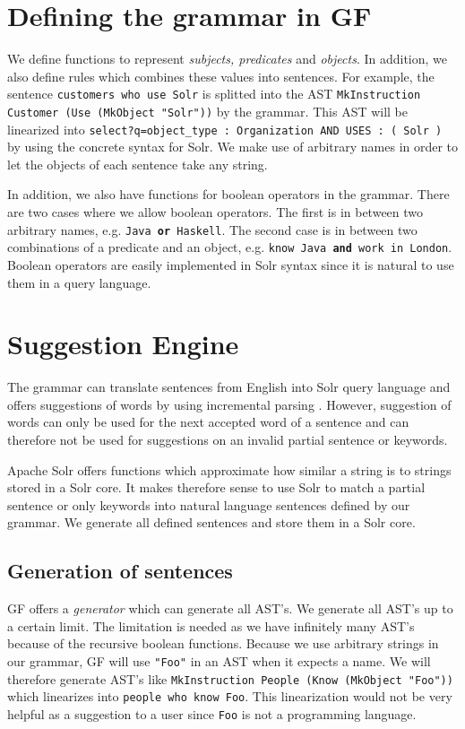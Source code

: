 \documentclass[10pt, a4paper]{article}
\begin{document}
\section{Defining the grammar in GF}
We define functions to represent \emph{subjects, predicates} and \emph{objects}. In addition, we also define rules which combines these values into sentences. For example, the sentence \texttt{customers who use Solr} is splitted into the AST \texttt{MkInstruction Customer (Use (MkObject "Solr"))} by the grammar. This AST will be linearized into \texttt{select?q=object\_type : Organization AND USES : ( Solr )} by using the concrete syntax for Solr. We make use of arbitrary names in order to let the objects of each sentence take any string.

In addition, we also have functions for boolean operators in the grammar. There are two cases where we allow boolean operators. The first is in between two arbitrary names, e.g. \texttt{Java \textbf{or} Haskell}. The second case is in between two combinations of a predicate and an object, e.g. \texttt{know Java \textbf{and} work in London}. Boolean operators are easily implemented in Solr syntax since it is natural to use them in a query language.

\section{Suggestion Engine}
The grammar can translate sentences from English into Solr query language and offers suggestions of words by using incremental parsing \cite{krasimir}. However, suggestion of words can only be used for the next accepted word of a sentence and can therefore not be used for suggestions on an invalid partial sentence or keywords.

Apache Solr offers functions which approximate how similar a string is to strings stored in a Solr core. It makes therefore sense to use Solr to match a partial sentence or only keywords into natural language sentences defined by our grammar. We generate all defined sentences and store them in a Solr core.

\subsection{Generation of sentences}
GF offers a \emph{generator} which can generate all AST's. We generate all AST's up to a certain limit. The limitation is needed as we have infinitely many AST's because of the recursive boolean functions. Because we use arbitrary strings in our grammar, GF will use  \texttt{"Foo"} in an AST when it expects a name. We will therefore generate AST's like \texttt{MkInstruction People (Know (MkObject "Foo"))} which linearizes into \texttt{people who know Foo}. This linearization would not be very helpful as a suggestion to a user since \texttt{Foo} is not a programming language.
\end{document}
